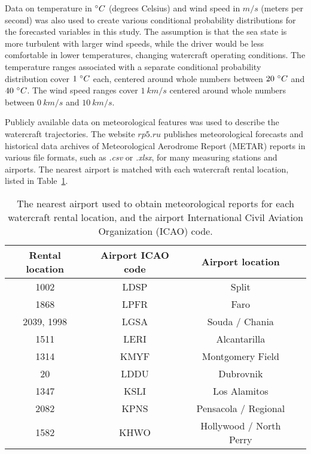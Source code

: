 \documentclass[preprint,12pt]{elsarticle}
\begin{document}
Data on temperature in $\degree C$ (degrees Celsius) and wind speed in $m/s$ (meters per second) was also used to create various conditional probability distributions for the forecasted variables in this study. The assumption is that the sea state is more turbulent with larger wind speeds, while the driver would be less comfortable in lower temperatures, changing watercraft operating conditions. The temperature ranges associated with a separate conditional probability distribution cover $1 \ \degree C$ each, centered around whole numbers between $20 \ \degree C$ and $40 \ \degree C$. The wind speed ranges cover $1 \ km/s$ centered around whole numbers between $0 \ km/s$ and $10 \ km/s$.

Publicly available data on meteorological features was used to describe the watercraft trajectories. The website $rp5.ru$ \cite{rp5Description} publishes meteorological forecasts and historical data archives of Meteorological Aerodrome Report (METAR) reports in various file formats, such as \textit{.csv} or \textit{.xlsx}, for many measuring stations and airports. The nearest airport is matched with each watercraft rental location, listed in Table~\ref{tab:airport}.

\begin{table}[!ht]
    \centering
    \begin{tabular}{|c|c|c|c|}
        \hline
        Rental location & Airport ICAO code & Airport location \\ \hline
        1002 & LDSP & Split \\ \hline
        1868 & LPFR & Faro \\ \hline 
        2039, 1998 & LGSA & Souda / Chania \\ \hline
        1511 & LERI & Alcantarilla \\ \hline
        1314 & KMYF & Montgomery Field \\ \hline
        20 & LDDU & Dubrovnik \\ \hline
        1347 & KSLI & Los Alamitos \\ \hline
        2082 & KPNS & Pensacola / Regional \\ \hline
        1582 & KHWO & Hollywood / North Perry \\ \hline
    \end{tabular}
    \caption{The nearest airport used to obtain meteorological reports for each watercraft rental location, and the airport International Civil Aviation Organization (ICAO) code.}
    \label{tab:airport}
\end{table}
\end{document}
